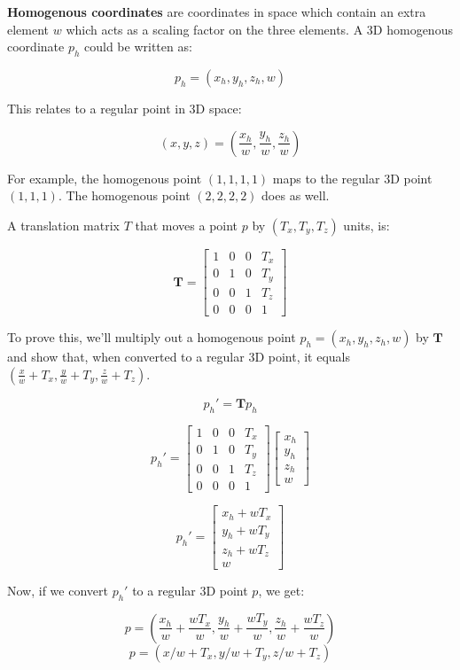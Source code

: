 \textbf{Homogenous coordinates} are coordinates in space which contain an extra element $w$ which acts as a scaling factor on the three elements. A 3D homogenous coordinate $p_h$ could be written as:

\[ p_h = (x_h, y_h, z_h, w) \]

This relates to a regular point in 3D space:

\[ (x, y, z) = (\frac{x_h}{w}, \frac{y_h}{w}, \frac{z_h}{w}) \] 

For example, the homogenous point $(1, 1, 1, 1)$ maps to the regular 3D point $(1, 1, 1)$. The homogenous point $(2, 2, 2, 2)$ does as well.

A translation matrix $T$ that moves a point $p$  by $(T_x, T_y, T_z)$ units, is:

\[
\mathbf{T} = \begin{bmatrix}
1 & 0 & 0 & T_x \\
0 & 1 & 0 & T_y \\
0 & 0 & 1 & T_z \\
0 & 0 & 0 & 1
\end{bmatrix}
\]

To prove this, we'll multiply out a homogenous point $p_h = (x_h, y_h, z_h, w)$ by $\mathbf{T}$ and show that, when converted to a regular 3D point, it equals $(\frac{x}{w} + T_x, \frac{y}{w} + T_y, \frac{z}{w} + T_z)$.

\[ p_{h}\prime = \mathbf{T} p_h \]

\[
  p_{h}\prime = \begin{bmatrix}
1 & 0 & 0 & T_x \\
0 & 1 & 0 & T_y \\
0 & 0 & 1 & T_z \\
0 & 0 & 0 & 1
\end{bmatrix} 
\begin{bmatrix}
x_h \\ y_h \\ z_h \\ w 
\end{bmatrix}
\]

\[
 p_{h}\prime = \begin{bmatrix}
 x_h + w T_x \\
 y_h + w T_y \\
 z_h + w T_z \\
 w
 \end{bmatrix}
 \]
 
 Now, if we convert $p_{h}\prime$ to a regular 3D point $p$, we get:
 
 \[ p = (\frac{x_h}{w} + \frac{w T_x}{w},  \frac{y_h}{w} + \frac{w T_y}{w}, \frac{z_h}{w} + \frac{w T_z}{w}) \]
 \[ p = (x/w + T_x, y/w + T_y, z/w + T_z) \]
 

